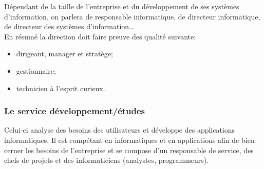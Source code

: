 \documentclass[10pt,a4paper,oneside,titlepage]{report}
\begin{document}
Dépendant de la taille de l’entreprise et du développement de ses systèmes
d’information, on parlera de responsable informatique, de directeur
informatique, de directeur des systèmes d’information\dots\\

En résumé la direction doit faire preuve des qualité suivante:
\begin{itemize}
\item dirigeant, manager et stratège;
\item gestionnaire;
\item technicien à l'esprit curieux.
\end{itemize}

\subsubsection{Le service développement/études}
Celui-ci analyse des besoins des utilisateurs et développe des applications
informatiques. Il est compétant en informatiques et en applications afin de bien
cerner les besoins de l’entreprise et se compose d'un responsable de service,
des chefs de projets et des informaticiens (analystes, programmeurs).\\
\end{document}
